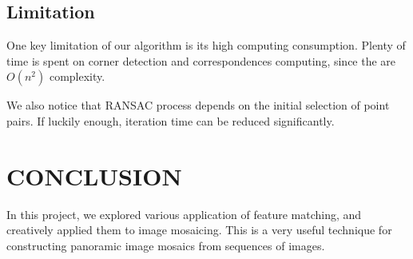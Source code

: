 \documentclass[letterpaper, 10 pt, conference]{ieeeconf}
\begin{document}
\subsection{Limitation}
One key limitation of our algorithm is its high computing consumption. Plenty of time is spent on corner detection and correspondences computing, since the are $O(n^2)$ complexity.

We also notice that RANSAC process depends on the initial selection of point pairs. If luckily enough, iteration time can be reduced significantly.

\section{CONCLUSION}
In this project, we explored various application of feature matching, and creatively applied them to image mosaicing. This is a very useful technique for constructing panoramic image mosaics from sequences of images.
\end{document}
